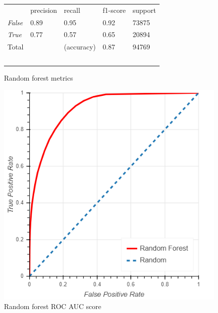 \documentclass[10pt, conference, compsocconf]{IEEEtran}
\begin{document}
\begin{figure}
  \begin{tabular}{lllll}
                  & precision & recall      & f1-score  & support \\
  \textit{False}  & 0.89      & 0.95        & 0.92      & 73875 \\
  \textit{True}   & 0.77      & 0.57        & 0.65      & 20894 \\
  Total           &           & (accuracy)  & 0.87      & 94769 \\\
  \end{tabular}
  \caption{Random forest metrics}
  \label{fig:random_forest_metrics}
\end{figure}

\begin{figure}
  \includegraphics[scale=0.45]{random_forest_roc}
  \centering
  \caption{Random forest ROC AUC score}
  \label{fig:random_forest_roc}
\end{figure}
\end{document}

